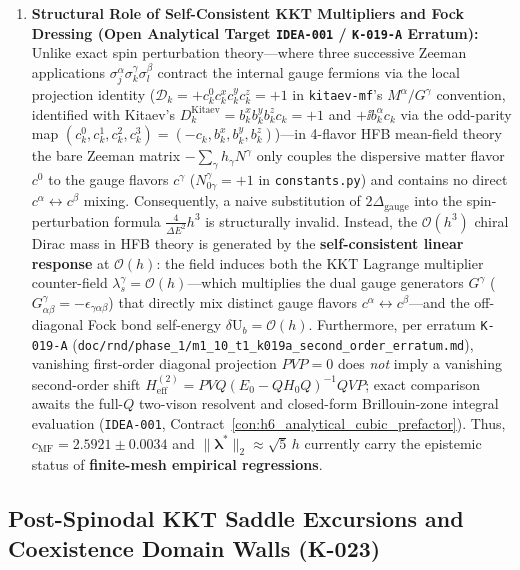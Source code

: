 \begin{enumerate}
\begin{equation}
\end{equation}
\item \textbf{Structural Role of Self-Consistent KKT Multipliers and Fock Dressing (Open Analytical Target \texttt{IDEA-001} / \texttt{K-019-A} Erratum):} Unlike exact spin perturbation theory---where three successive Zeeman applications $\sigma_j^\alpha \sigma_k^\gamma \sigma_l^\beta$ contract the internal gauge fermions via the local projection identity ($\mathcal{D}_k = +c_k^0 c_k^x c_k^y c_k^z = +1$ in \texttt{kitaev-mf}'s $M^\alpha/G^\gamma$ convention, identified with Kitaev's $D_k^{\mathrm{Kitaev}} = b_k^x b_k^y b_k^z c_k = +1$ and $+\ii b_k^\alpha c_k$ via the odd-parity map $(c_k^0, c_k^1, c_k^2, c_k^3) = (-c_k, b_k^x, b_k^y, b_k^z)$)---in 4-flavor HFB mean-field theory the bare Zeeman matrix $-\sum_\gamma h_\gamma N^\gamma$ only couples the dispersive matter flavor $c^0$ to the gauge flavors $c^\gamma$ ($N^\gamma_{0\gamma} = +1$ in \texttt{constants.py}) and contains no direct $c^\alpha \leftrightarrow c^\beta$ mixing. Consequently, a naive substitution of $2\Delta_{\mathrm{gauge}}$ into the spin-perturbation formula $\frac{4}{\Delta E^2}h^3$ is structurally invalid. Instead, the $\mathcal{O}(h^3)$ chiral Dirac mass in HFB theory is generated by the \textbf{self-consistent linear response} at $\mathcal{O}(h)$: the field induces both the KKT Lagrange multiplier counter-field $\lambda_s^\gamma = \mathcal{O}(h)$---which multiplies the dual gauge generators $G^\gamma$ ($G^\gamma_{\alpha\beta} = -\epsilon_{\gamma\alpha\beta}$) that directly mix distinct gauge flavors $c^\alpha \leftrightarrow c^\beta$---and the off-diagonal Fock bond self-energy $\delta \mathrm{U}_b = \mathcal{O}(h)$. Furthermore, per erratum \texttt{K-019-A} (\texttt{doc/rnd/phase\_1/m1\_10\_t1\_k019a\_second\_order\_erratum.md}), vanishing first-order diagonal projection $PVP=0$ does \emph{not} imply a vanishing second-order shift $H_{\mathrm{eff}}^{(2)} = PV Q(E_0 - Q H_0 Q)^{-1} Q VP$; exact comparison awaits the full-$Q$ two-vison resolvent and closed-form Brillouin-zone integral evaluation (\texttt{IDEA-001}, Contract~\ref{con:h6_analytical_cubic_prefactor}). Thus, $c_{\mathrm{MF}} = 2.5921 \pm 0.0034$ and $\|\boldsymbol{\lambda}^*\|_2 \approx \sqrt{5}\,h$ currently carry the epistemic status of \textbf{finite-mesh empirical regressions}.
\end{enumerate}

\subsection{Post-Spinodal KKT Saddle Excursions and Coexistence Domain Walls (K-023)}
\label{sec:m1_6_post_spinodal_kkt_audit}

